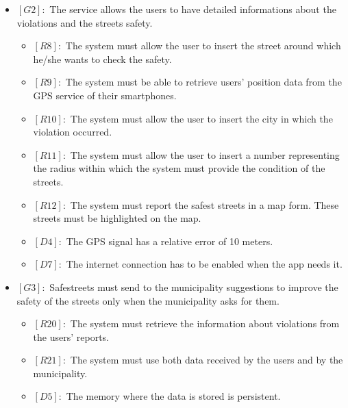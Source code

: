 \documentclass[titlepage]{article}
\begin{document}
\begin{itemize}
\begin{itemize}
 	
 \end{itemize}
 \item $[G2]:$ The service allows the users to have detailed informations about the violations and the streets safety.
 \begin{itemize}
 	\item $[R8]:$ The system must allow the user to insert the street around which he/she wants to check the safety.
 	\item $[R9]:$ The system must be able to retrieve users' position data from the GPS service of their smartphones.
 	\item $[R10]:$ The system must allow the user to insert the city in which the violation occurred.
 	\item $[R11]:$ The system must allow the user to insert a number representing the radius within which the system must provide the condition of the streets.
 	\item $[R12]:$ The system must report the  safest streets in a map form. These streets must be highlighted on the map.
 	\item $[D4]:$ The GPS signal has a relative error of 10 meters.
 	\item $[D7]:$ The internet connection has to be enabled when the app needs it.
 \end{itemize}
 
 
 
 \item $[G3]:$ Safestreets must send to the municipality suggestions to improve the safety of the streets only when the municipality asks for them.
 \begin{itemize}
 \item $[R20]:$ The system must retrieve the information about violations from the users' reports.
 \item $[R21]:$ The system must use both data received by the users and by the municipality.
 \item $[D5]:$ The memory where the data is stored is persistent.
 \end{itemize}
 

\end{itemize}
\end{document}
